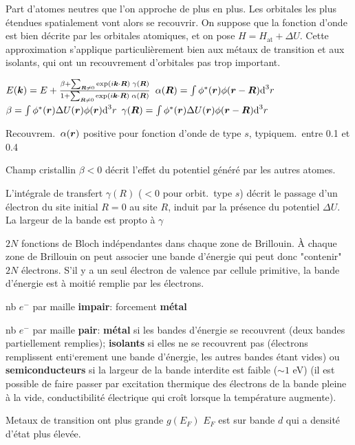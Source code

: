 Part d'atomes neutres que l'on approche de plus en plus.
Les orbitales les plus étendues spatialement vont alors se recouvrir. 
On suppose que la fonction d'onde est bien décrite par les orbitales
atomiques, et on pose $H = H_{\text{at}} + \Delta U$. 
Cette approximation s'applique particulièrement
bien aux métaux de transition et aux isolants, qui ont un recouvrement d'orbitales pas
trop important.
\begin{squishlist}
    \item $E(\bm{k}) = E + \frac{\beta + \sum_{\bm{R} \neq 0}\exp(i\bm{k} \cdot \bm{R}) \; \gamma(\bm{R})}{1 + \sum_{\bm{R} \neq 0}\exp(i\bm{k} \cdot \bm{R})\; \alpha(\bm{R})}$
    \qquad $\alpha(\bm{R}) = \int \phi^*(\bm{r})\phi(\bm{r} - \bm{R}) \textrm{d}^3 r$ \\
    $\beta = \int \phi^*(\bm{r})\Delta U (\bm{r}) \phi(\bm{r}) \textrm{d}^3 r$ \qquad $\gamma(\bm{R}) = \int \phi^*(\bm{r})\Delta U (\bm{r}) \phi(\bm{r} - \bm{R}) \textrm{d}^3 r$
    \item Recouvrem.\ $\alpha(\bm{r})$ positive pour fonction d'onde de type $s$, typiquem.\ entre 0.1 et 0.4
    \item Champ cristallin $\beta < 0$ décrit l'effet du potentiel généré par les autres atomes.
    \item L'intégrale de transfert $\gamma(R)$ ($<0$ pour orbit.\ type $s$) décrit le passage d'un électron du site initial $R = 0$ au site $R$, induit par la présence du potentiel $\Delta U$.
    La largeur de la bande est propto à $\gamma$
\end{squishlist}

$2N$ fonctions de Bloch indépendantes dans chaque zone de Brillouin.
À chaque zone de Brillouin on peut associer une bande d'énergie qui peut donc "contenir" $2N$ électrons.
S’il y a un seul électron de valence par cellule primitive, la bande d’énergie
est à moitié remplie par les électrons.
\begin{squishlist}
    \item  nb $e^-$ par maille \textbf{impair}: forcement \textbf{métal}
    \item  nb $e^-$ par maille \textbf{pair}: \textbf{métal} si les bandes d'énergie se recouvrent (deux bandes partiellement remplies); \textbf{isolants} si elles ne se recouvrent pas (électrons remplissent enti`erement une bande d’énergie, les autres bandes étant vides) ou \textbf{semiconducteurs} si la largeur de la bande interdite est faible ($\sim 1 $ eV) (il est possible de faire passer par excitation thermique des électrons de la bande pleine à la vide, conductibilité électrique qui croît lorsque la température augmente).
    \item Metaux de transition ont plus grande $g(E_F)$ $E_F$ est sur bande $d$ qui a densité d'état plus élevée.
\end{squishlist}



